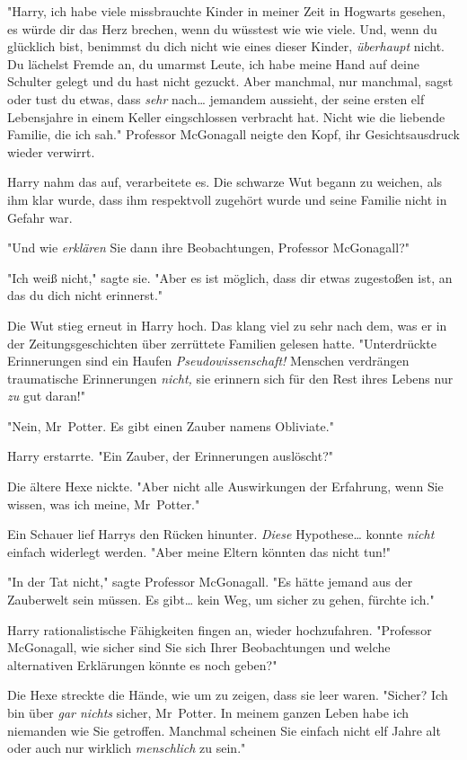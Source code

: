 {"Harry, ich habe viele missbrauchte Kinder in meiner Zeit in Hogwarts gesehen, es würde dir das Herz brechen, wenn du wüsstest wie wie viele. Und, wenn du glücklich bist, benimmst du dich nicht wie eines dieser Kinder, \emph{überhaupt} nicht. Du lächelst Fremde an, du umarmst Leute, ich habe meine Hand auf deine Schulter gelegt und du hast nicht gezuckt. Aber manchmal, nur manchmal, sagst oder tust du etwas, dass \emph{sehr} nach… jemandem aussieht, der seine ersten elf Lebensjahre in einem Keller eingschlossen verbracht hat. Nicht wie die liebende Familie, die ich sah." Professor McGonagall neigte den Kopf, ihr Gesichtsausdruck wieder verwirrt.

Harry nahm das auf, verarbeitete es. Die schwarze Wut begann zu weichen, als ihm klar wurde, dass ihm respektvoll zugehört wurde und seine Familie nicht in Gefahr war.

"Und wie \emph{erklären} Sie dann ihre Beobachtungen, Professor McGonagall?"

"Ich weiß nicht," sagte sie. "Aber es ist möglich, dass dir etwas zugestoßen ist, an das du dich nicht erinnerst."

Die Wut stieg erneut in Harry hoch. Das klang viel zu sehr nach dem, was er in der Zeitungsgeschichten über zerrüttete Familien gelesen hatte. "Unterdrückte Erinnerungen sind ein Haufen \emph{Pseudowissenschaft!} Menschen verdrängen traumatische Erinnerungen \emph{nicht,} sie erinnern sich für den Rest ihres Lebens nur \emph{zu} gut daran!"

"Nein, Mr~Potter. Es gibt einen Zauber namens Obliviate."

Harry erstarrte. "Ein Zauber, der Erinnerungen auslöscht?"

Die ältere Hexe nickte. "Aber nicht alle Auswirkungen der Erfahrung, wenn Sie wissen, was ich meine, Mr~Potter."

Ein Schauer lief Harrys den Rücken hinunter. \emph{Diese} Hypothese… konnte \emph{nicht} einfach widerlegt werden. "Aber meine Eltern könnten das nicht tun!"

"In der Tat nicht," sagte Professor McGonagall. "Es hätte jemand aus der Zauberwelt sein müssen. Es gibt… kein Weg, um sicher zu gehen, fürchte ich."

Harry rationalistische Fähigkeiten fingen an, wieder hochzufahren. "Professor McGonagall, wie sicher sind Sie sich Ihrer Beobachtungen und welche alternativen Erklärungen könnte es noch geben?"

Die Hexe streckte die Hände, wie um zu zeigen, dass sie leer waren. "Sicher? Ich bin über \emph{gar nichts} sicher, Mr~Potter. In meinem ganzen Leben habe ich niemanden wie Sie getroffen. Manchmal scheinen Sie einfach nicht elf Jahre alt oder auch nur wirklich \emph{menschlich} zu sein."

}
